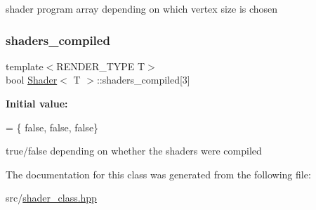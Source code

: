 shader program array depending on which vertex size is chosen \mbox{\label{classShader_a057162ea090f838f7fbb658cb301efc4}} 
\subsubsection{\texorpdfstring{shaders\+\_\+compiled}{shaders\_compiled}}
{\footnotesize\ttfamily template$<$R\+E\+N\+D\+E\+R\+\_\+\+T\+Y\+PE T$>$ \\
bool \mbox{\hyperlink{classShader}{Shader}}$<$ T $>$\+::shaders\+\_\+compiled\mbox{[}3\mbox{]}\hspace{0.3cm}{\ttfamily [protected]}}

{\bfseries Initial value\+:}
\begin{DoxyCode}
= \{
        \textcolor{keyword}{false}, \textcolor{keyword}{false},
        \textcolor{keyword}{false}\}
\end{DoxyCode}
true/false depending on whether the shaders were compiled 

The documentation for this class was generated from the following file\+:\begin{DoxyCompactItemize}
\item 
src/\mbox{\hyperlink{shader__class_8hpp}{shader\+\_\+class.\+hpp}}\end{DoxyCompactItemize}
